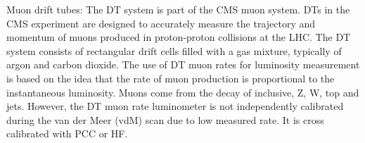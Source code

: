 \begin{itemize}
{%

\item Muon drift tubes: The DT system is part of the CMS muon system. %
  DTs in the CMS experiment are designed to accurately measure the trajectory and momentum of muons produced in proton-proton collisions at the LHC.
  The DT system consists of rectangular drift cells filled with a gas mixture, typically of argon and carbon dioxide. The use of DT muon rates for luminosity measurement is based on the idea that the rate of muon production is proportional to the instantaneous luminosity. Muons come from the decay of inclusive, Z, W, top and jets.
However, the DT muon rate luminometer is not independently calibrated during the van der Meer (vdM) scan due to low measured rate. It is cross calibrated with PCC or HF.
  
}
\end{itemize}
